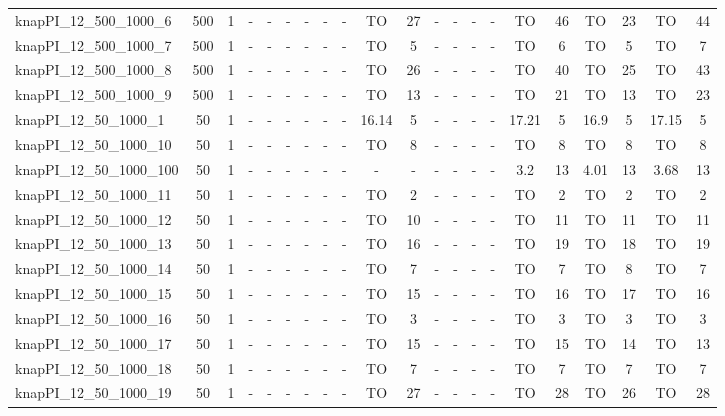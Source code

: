 \begin{sidewaystable}[!ht]
{\begin{tabular}{lcccccccccccccccccccc}
knapPI\_12\_500\_1000\_6 & 500 & 1 &  - &  - &  - &  - &  - &  - & TO & 27 &  - &  - &  - &  - & TO & 46 & TO & 23 & TO & 44 \\
knapPI\_12\_500\_1000\_7 & 500 & 1 &  - &  - &  - &  - &  - &  - & TO & 5 &  - &  - &  - &  - & TO & 6 & TO & 5 & TO & 7 \\
knapPI\_12\_500\_1000\_8 & 500 & 1 &  - &  - &  - &  - &  - &  - & TO & 26 &  - &  - &  - &  - & TO & 40 & TO & 25 & TO & 43 \\
knapPI\_12\_500\_1000\_9 & 500 & 1 &  - &  - &  - &  - &  - &  - & TO & 13 &  - &  - &  - &  - & TO & 21 & TO & 13 & TO & 23 \\
knapPI\_12\_50\_1000\_1 & 50 & 1 &  - &  - &  - &  - &  - &  - & 16.14 & 5 &  - &  - &  - &  - & 17.21 & 5 & 16.9 & 5 & 17.15 & 5 \\
knapPI\_12\_50\_1000\_10 & 50 & 1 &  - &  - &  - &  - &  - &  - & TO & 8 &  - &  - &  - &  - & TO & 8 & TO & 8 & TO & 8 \\
knapPI\_12\_50\_1000\_100 & 50 & 1 &  - &  - &  - &  - &  - &  - &  - &  - &  - &  - &  - &  - & 3.2 & 13 & 4.01 & 13 & 3.68 & 13 \\
knapPI\_12\_50\_1000\_11 & 50 & 1 &  - &  - &  - &  - &  - &  - & TO & 2 &  - &  - &  - &  - & TO & 2 & TO & 2 & TO & 2 \\
knapPI\_12\_50\_1000\_12 & 50 & 1 &  - &  - &  - &  - &  - &  - & TO & 10 &  - &  - &  - &  - & TO & 11 & TO & 11 & TO & 11 \\
knapPI\_12\_50\_1000\_13 & 50 & 1 &  - &  - &  - &  - &  - &  - & TO & 16 &  - &  - &  - &  - & TO & 19 & TO & 18 & TO & 19 \\
knapPI\_12\_50\_1000\_14 & 50 & 1 &  - &  - &  - &  - &  - &  - & TO & 7 &  - &  - &  - &  - & TO & 7 & TO & 8 & TO & 7 \\
knapPI\_12\_50\_1000\_15 & 50 & 1 &  - &  - &  - &  - &  - &  - & TO & 15 &  - &  - &  - &  - & TO & 16 & TO & 17 & TO & 16 \\
knapPI\_12\_50\_1000\_16 & 50 & 1 &  - &  - &  - &  - &  - &  - & TO & 3 &  - &  - &  - &  - & TO & 3 & TO & 3 & TO & 3 \\
knapPI\_12\_50\_1000\_17 & 50 & 1 &  - &  - &  - &  - &  - &  - & TO & 15 &  - &  - &  - &  - & TO & 15 & TO & 14 & TO & 13 \\
knapPI\_12\_50\_1000\_18 & 50 & 1 &  - &  - &  - &  - &  - &  - & TO & 7 &  - &  - &  - &  - & TO & 7 & TO & 7 & TO & 7 \\
knapPI\_12\_50\_1000\_19 & 50 & 1 &  - &  - &  - &  - &  - &  - & TO & 27 &  - &  - &  - &  - & TO & 28 & TO & 26 & TO & 28 \\

\end{tabular}}
\end{sidewaystable}
